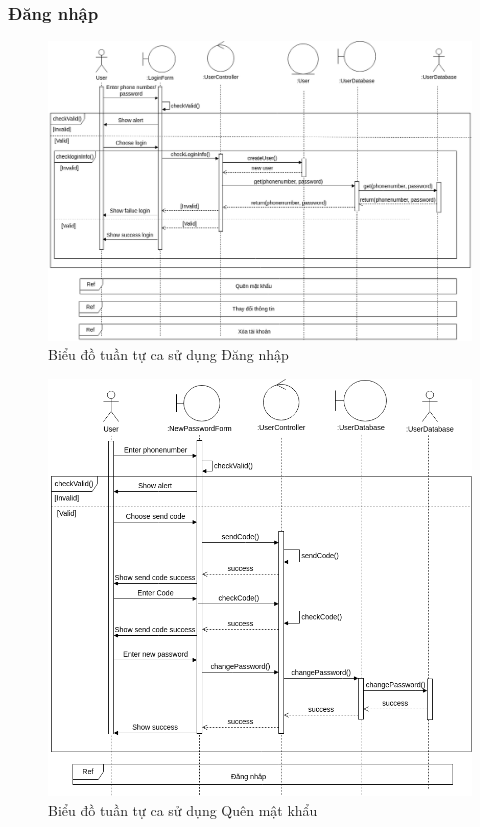 \subsubsection{Đăng nhập}
\begin{figure}[H]
    \centering
    \includegraphics[width=\textwidth]{img2/Analysis-Đăng nhập.drawio.png}
    \caption{Biểu đồ tuần tự ca sử dụng Đăng nhập}
\end{figure}

\begin{figure}[H]
    \centering
    \includegraphics[width=\textwidth]{img2/Analysis-Đổi mật khẩu.drawio.png}
    \caption{Biểu đồ tuần tự ca sử dụng Quên mật khẩu}
\end{figure}

